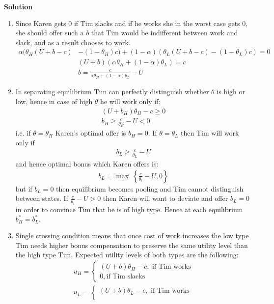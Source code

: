 \documentclass[a4paper]{article}
\begin{document}
\textbf{Solution}

\begin{enumerate}
	\item Since Karen gets 0 if Tim slacks and if he works she in the worst case gets 0, she should offer such a $b$ that Tim would be indifferent between work and slack, and as a result chooses to work.
	\begin{align*}
	\alpha(\theta_H(U + b - c) &- (1 - \theta_H)c) + (1 - \alpha)(\theta_L(U + b - c) - (1 - \theta_L)c) = 0\\
	&(U+b)(\alpha\theta_H + (1 - \alpha)\theta_L) = c\\
	&b = \frac{c}{\alpha\theta_H + (1 - \alpha)\theta_L} - U
	\end{align*}
	\item In separating equilibrium Tim can perfectly distinguish whether $\theta$ is high or low, hence in case of high $\theta$ he will work only if:
	\begin{align*}
	(U + b_H)\theta_H - c \ge 0\\
	b_H \ge \frac{c}{\theta_H} - U < 0
	\end{align*}
	i.e. if $\theta = \theta_H$ Karen's optimal offer is $b_H = 0$. If $\theta = \theta_L$ then Tim will work only if
	\begin{align*}
	b_L \ge \frac{c}{\theta_L} - U
	\end{align*}
	and hence optimal bonus which Karen offers is:
	\begin{align*}
	b_L = \max\ \left\{\frac{c}{\theta_l} - U, 0\right\}
	\end{align*}
	but if $b_L = 0$ then equilibrium becomes pooling and Tim cannot distinguish between states. If $\frac{c}{\theta_l} - U > 0$ then Karen will want to deviate and offer $b_L = 0$ in order to convince Tim that he is of high type. Hence at each equilibrium $b^*_H = b^*_L$.
	\item Single crossing condition means that once cost of work increases the low type Tim needs higher bonus compensation to preserve the same utility level than the high type Tim. Expected utility levels of both types are the following:
	\begin{align*}
	u_H = \begin{cases}
	(U + b) \theta_H - c, \text{ if Tim works}\\
	0, \text{if Tim slacks}
	\end{cases}\\
	u_L = \begin{cases}
	(U + b) \theta_L - c, \text{ if Tim works}\\

\end{cases}
\end{align*}
\end{enumerate}
\end{document}
